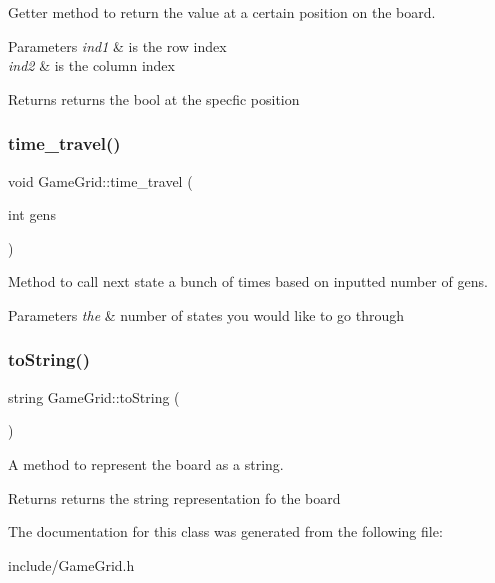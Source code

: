 Getter method to return the value at a certain position on the board. 


\begin{DoxyParams}{Parameters}
{\em ind1} & is the row index \\
\hline
{\em ind2} & is the column index \\
\hline
\end{DoxyParams}
\begin{DoxyReturn}{Returns}
returns the bool at the specfic position 
\end{DoxyReturn}
\mbox{\label{class_game_grid_a9c207942c6e8c40a4f7735295e535e3e}} 
\subsubsection{\texorpdfstring{time\_travel()}{time\_travel()}}
{\footnotesize\ttfamily void Game\+Grid\+::time\+\_\+travel (\begin{DoxyParamCaption}\item[{int}]{gens }\end{DoxyParamCaption})}



Method to call next state a bunch of times based on inputted number of gens. 


\begin{DoxyParams}{Parameters}
{\em the} & number of states you would like to go through \\
\hline
\end{DoxyParams}
\mbox{\label{class_game_grid_acea99c50b01e9e7c47ff4c23494efde1}} 
\subsubsection{\texorpdfstring{toString()}{toString()}}
{\footnotesize\ttfamily string Game\+Grid\+::to\+String (\begin{DoxyParamCaption}{ }\end{DoxyParamCaption})}



A method to represent the board as a string. 

\begin{DoxyReturn}{Returns}
returns the string representation fo the board 
\end{DoxyReturn}


The documentation for this class was generated from the following file\+:\begin{DoxyCompactItemize}
\item 
include/Game\+Grid.\+h\end{DoxyCompactItemize}

